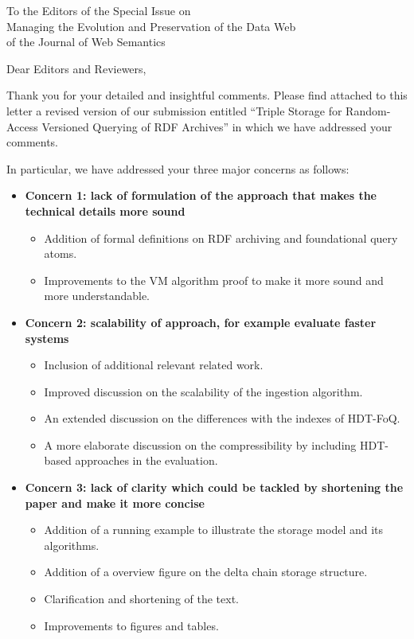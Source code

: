 \documentclass{letter}
\begin{document}
\begin{letter}{To the Editors of the Special Issue on\\Managing the Evolution and Preservation of the Data Web\\of the Journal of Web Semantics}

\opening{Dear Editors and Reviewers,}

\bigskip

Thank you for your detailed and insightful comments.
Please find attached to this letter a revised version of our submission entitled
\enquote{Triple Storage for Random-Access Versioned Querying of RDF Archives}
in which we have addressed your comments.

\bigskip

In particular, we have addressed your three major concerns as follows:
\begin{itemize}
  \item \textbf{Concern 1: lack of formulation of the approach that makes the technical details more sound}
    \begin{itemize}
      \item Addition of formal definitions on RDF archiving and foundational query atoms.
      \item Improvements to the VM algorithm proof to make it more sound and more understandable.
    \end{itemize}
  \item \textbf{Concern 2: scalability of approach, for example evaluate faster systems}
    \begin{itemize}
      \item Inclusion of additional relevant related work.
      \item Improved discussion on the scalability of the ingestion algorithm.
      \item An extended discussion on the differences with the indexes of HDT-FoQ.
      \item A more elaborate discussion on the compressibility by including HDT-based approaches in the evaluation.
    \end{itemize}
  \item \textbf{Concern 3: lack of clarity which could be tackled by shortening the paper and make it more concise}
    \begin{itemize}
      \item Addition of a running example to illustrate the storage model and its algorithms.
      \item Addition of a overview figure on the delta chain storage structure.
      \item Clarification and shortening of the text.
      \item Improvements to figures and tables.
    \end{itemize}
\end{itemize}


\end{letter}
\end{document}
